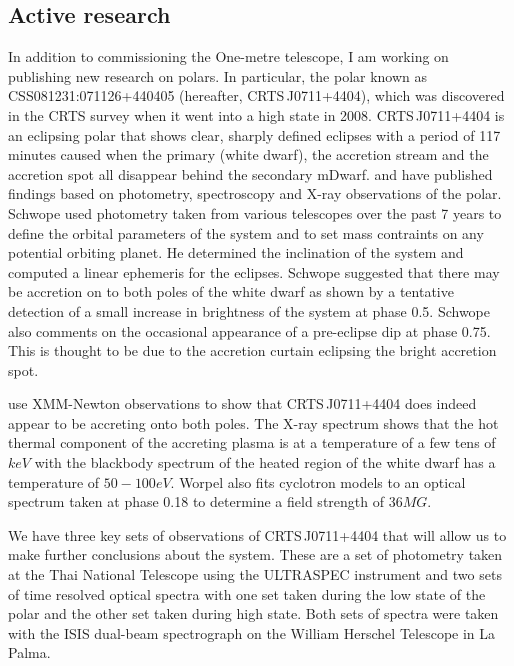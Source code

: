 \documentclass[a4paper,fleqn,usenatbib]{mnras}
\begin{document}
\subsection{Active research}
In addition to commissioning the One-metre telescope, I am working on publishing new research on polars. In particular, the polar known as CSS081231:071126+440405 (hereafter,  CRTS\,J0711+4404), which was discovered in the CRTS survey when it went into a high state in 2008.  CRTS\,J0711+4404 is an eclipsing polar that shows  clear, sharply defined eclipses  with a period of 117 minutes caused when the primary (white dwarf), the accretion stream and the accretion spot all disappear behind the secondary mDwarf.  \citet{Schwope2015} and \citet{Worpel2015} have published findings based on photometry, spectroscopy and X-ray observations of the polar. Schwope used photometry taken from various telescopes over the past 7 years to define the orbital parameters of the system and to set mass contraints on any potential orbiting planet. He determined the inclination of the system and computed a linear ephemeris for the eclipses. Schwope suggested that there may be accretion on to both poles of the white dwarf as shown by a tentative detection of a small increase in brightness of the system at phase 0.5. Schwope also comments on the occasional appearance of a pre-eclipse dip at phase 0.75. This is thought to be due to the accretion curtain eclipsing the bright accretion spot.  

\citet{Worpel2015} use XMM-Newton observations to show that CRTS\,J0711+4404 does indeed appear to be accreting onto both poles. The X-ray spectrum shows that the hot thermal component of the accreting plasma is at a temperature of a few tens of $keV$ with the blackbody spectrum of the heated region of the white dwarf has a temperature of $50-100 eV$. Worpel also fits cyclotron models to an optical spectrum taken at phase 0.18 to determine a field strength of $36MG$. 

We have three key sets of observations of CRTS\,J0711+4404 that will allow us to make further conclusions about the system. These are a set of photometry taken at the Thai National Telescope using the ULTRASPEC instrument and two sets of time resolved optical spectra with one set taken during the low state of the polar and the other set taken during high state. Both sets of spectra were taken with the ISIS dual-beam spectrograph on the William Herschel Telescope in La Palma.
\end{document}
